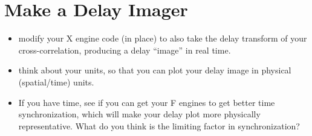 \documentclass[11pt]{article}
\begin{document}
\section{Make a Delay Imager}

\begin{itemize}
\item modify your X engine code (in place) to also take the delay transform of your cross-correlation, producing
a delay ``image'' in real time.
\item think about your units, so that you can plot your delay image in physical (spatial/time) units.
\item If you have time, see if you can get your F engines to get better time synchronization, which will
make your delay plot more physically representative.  What do you think is the limiting factor in synchronization?
\end{itemize}
\end{document}
